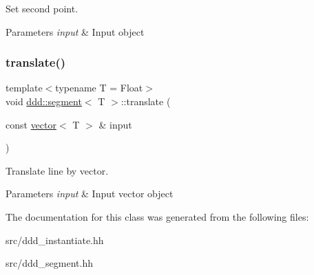 Set second point. 


\begin{DoxyParams}{Parameters}
{\em input} & Input object \\
\hline
\end{DoxyParams}
\mbox{\label{classddd_1_1segment_a6d8ad6c6abeea8de7ff679a8f55033ff}} 
\subsubsection{\texorpdfstring{translate()}{translate()}}
{\footnotesize\ttfamily template$<$typename T = Float$>$ \\
void \hyperlink{classddd_1_1segment}{ddd\+::segment}$<$ T $>$\+::translate (\begin{DoxyParamCaption}\item[{const \hyperlink{classddd_1_1vector}{vector}$<$ T $>$ \&}]{input }\end{DoxyParamCaption})\hspace{0.3cm}{\ttfamily [inline]}}



Translate line by vector. 


\begin{DoxyParams}{Parameters}
{\em input} & Input vector object \\
\hline
\end{DoxyParams}


The documentation for this class was generated from the following files\+:\begin{DoxyCompactItemize}
\item 
src/ddd\+\_\+instantiate.\+hh\item 
src/ddd\+\_\+segment.\+hh\end{DoxyCompactItemize}
